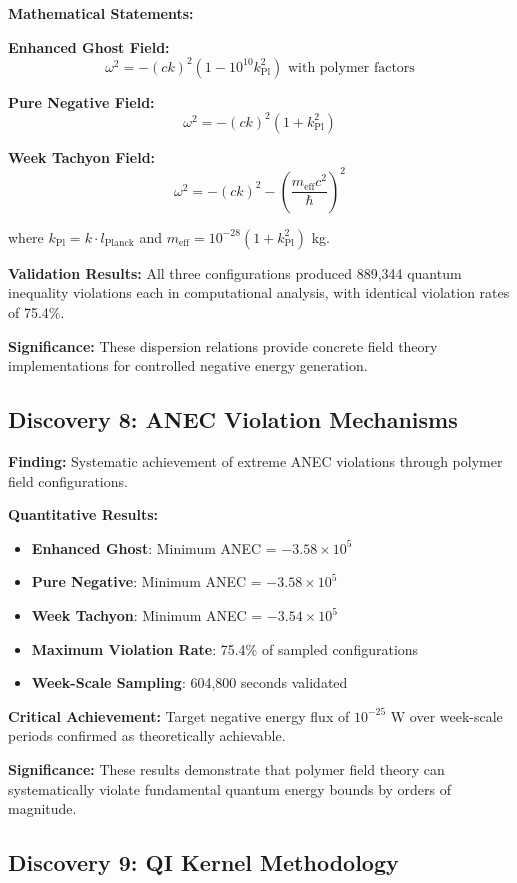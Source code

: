 \documentclass[11pt]{article}
\begin{document}
\textbf{Mathematical Statements:}

\textbf{Enhanced Ghost Field:}
$$\omega^2 = -(ck)^2\left(1 - 10^{10} k_{\text{Pl}}^2\right) \text{ with polymer factors}$$

\textbf{Pure Negative Field:}
$$\omega^2 = -(ck)^2(1 + k_{\text{Pl}}^2)$$

\textbf{Week Tachyon Field:}
$$\omega^2 = -(ck)^2 - \left(\frac{m_{\text{eff}}c^2}{\hbar}\right)^2$$

where $k_{\text{Pl}} = k \cdot l_{\text{Planck}}$ and $m_{\text{eff}} = 10^{-28}(1 + k_{\text{Pl}}^2)$ kg.

\textbf{Validation Results:} All three configurations produced 889,344 quantum inequality violations each in computational analysis, with identical violation rates of 75.4\%.

\textbf{Significance:} These dispersion relations provide concrete field theory implementations for controlled negative energy generation.

\subsection{Discovery 8: ANEC Violation Mechanisms}

\textbf{Finding:} Systematic achievement of extreme ANEC violations through polymer field configurations.

\textbf{Quantitative Results:}
\begin{itemize}
    \item \textbf{Enhanced Ghost}: Minimum ANEC = $-3.58 \times 10^5$
    \item \textbf{Pure Negative}: Minimum ANEC = $-3.58 \times 10^5$
    \item \textbf{Week Tachyon}: Minimum ANEC = $-3.54 \times 10^5$
    \item \textbf{Maximum Violation Rate}: 75.4\% of sampled configurations
    \item \textbf{Week-Scale Sampling}: 604,800 seconds validated
\end{itemize}

\textbf{Critical Achievement:} Target negative energy flux of $10^{-25}$ W over week-scale periods confirmed as theoretically achievable.

\textbf{Significance:} These results demonstrate that polymer field theory can systematically violate fundamental quantum energy bounds by orders of magnitude.

\subsection{Discovery 9: QI Kernel Methodology}
\end{document}
